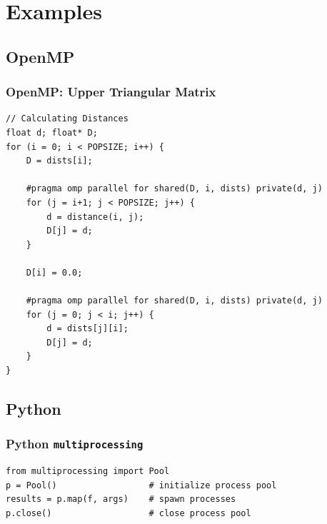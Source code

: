\documentclass[t]{beamer}
\begin{document}
\section{Examples}
\subsection{OpenMP}
\begin{frame}[fragile]
\frametitle{OpenMP: Upper Triangular Matrix}
\begin{verbatim}
// Calculating Distances
float d; float* D;
for (i = 0; i < POPSIZE; i++) {
    D = dists[i];

    #pragma omp parallel for shared(D, i, dists) private(d, j)
    for (j = i+1; j < POPSIZE; j++) {
        d = distance(i, j);
        D[j] = d;
    }
    
    D[i] = 0.0;
    
    #pragma omp parallel for shared(D, i, dists) private(d, j)
    for (j = 0; j < i; j++) {
        d = dists[j][i];
        D[j] = d;
    }
}
\end{verbatim}
\end{frame}

\subsection{Python}
\begin{frame}[fragile]
\frametitle{Python \texttt{multiprocessing}}
\begin{verbatim}
from multiprocessing import Pool
p = Pool()                  # initialize process pool
results = p.map(f, args)    # spawn processes
p.close()                   # close process pool 
\end{verbatim}
\end{frame}
\end{document}
